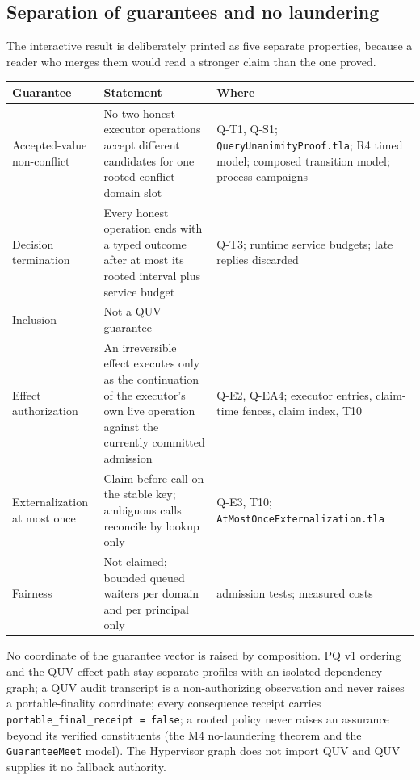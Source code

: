 \documentclass[11pt]{article}
\newcommand{\code}[1]{\texttt{#1}}
\begin{document}
\subsection{Separation of guarantees and no laundering}
\label{sec:quv-separation}

The interactive result is deliberately printed as five separate properties,
because a reader who merges them would read a stronger claim than the one
proved.

\begin{center}
\small
\begin{tabularx}{\textwidth}{>{\raggedright\arraybackslash}p{} X >{\raggedright\arraybackslash}p{}}
\toprule
\textbf{Guarantee} & \textbf{Statement} & \textbf{Where} \\
\midrule
Accepted-value non-conflict & No two honest executor operations accept different candidates for one rooted conflict-domain slot & Q-T1, Q-S1; \code{QueryUnanimityProof.tla}; R4 timed model; composed transition model; process campaigns \\
Decision termination & Every honest operation ends with a typed outcome after at most its rooted interval plus service budget & Q-T3; runtime service budgets; late replies discarded \\
Inclusion & Not a QUV guarantee & --- \\
Effect authorization & An irreversible effect executes only as the continuation of the executor's own live operation against the currently committed admission & Q-E2, Q-EA4; executor entries, claim-time fences, claim index, T10 \\
Externalization at most once & Claim before call on the stable key; ambiguous calls reconcile by lookup only & Q-E3, T10; \code{AtMostOnceExternalization.tla} \\
Fairness & Not claimed; bounded queued waiters per domain and per principal only & admission tests; measured costs \\
\bottomrule
\end{tabularx}
\end{center}

No coordinate of the guarantee vector is raised by composition. PQ v1
ordering and the QUV effect path stay separate profiles with an isolated
dependency graph; a QUV audit transcript is a non-authorizing observation and
never raises a portable-finality coordinate; every consequence receipt carries
\code{portable\_final\_receipt = false}; a rooted policy never raises an
assurance beyond its verified constituents (the M4 no-laundering theorem and
the \code{GuaranteeMeet} model). The Hypervisor graph does not import QUV and
QUV supplies it no fallback authority.
\end{document}
